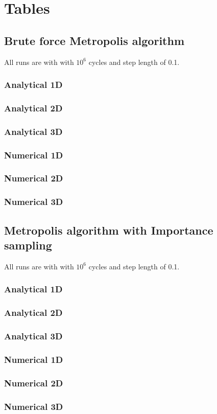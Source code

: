 \section{Tables}
\subsection{Brute force Metropolis algorithm}
All runs are with with $10^6$ cycles and step length
of 0.1.
\subsubsection{Analytical 1D}

\subsubsection{Analytical 2D}

\subsubsection{Analytical 3D}

\newpage
\subsubsection{Numerical 1D}

\subsubsection{Numerical 2D}

\subsubsection{Numerical 3D}

\newpage
\subsection{Metropolis algorithm with Importance sampling}
All runs are with with $10^6$ cycles and step length
of 0.1.
\subsubsection{Analytical 1D}

\subsubsection{Analytical 2D}

\subsubsection{Analytical 3D}

\newpage
\subsubsection{Numerical 1D}

\subsubsection{Numerical 2D}

\subsubsection{Numerical 3D}

